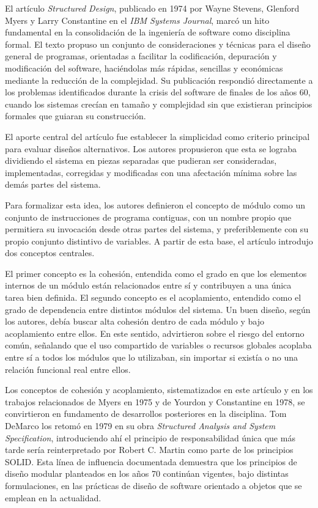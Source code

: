 \documentclass{./plantilla/umss}
\begin{document}
El artículo \textit{Structured Design}, publicado en 1974 por Wayne Stevens, Glenford Myers y Larry Constantine en el \textit{IBM Systems Journal}, marcó un hito fundamental en la consolidación de la ingeniería de software como disciplina formal. El texto propuso un conjunto de consideraciones y técnicas para el diseño general de programas, orientadas a facilitar la codificación, depuración y modificación del software, haciéndolas más rápidas, sencillas y económicas mediante la reducción de la complejidad. Su publicación respondió directamente a los problemas identificados durante la crisis del software de finales de los años 60, cuando los sistemas crecían en tamaño y complejidad sin que existieran principios formales que guiaran su construcción.

El aporte central del artículo fue establecer la simplicidad como criterio principal para evaluar diseños alternativos. Los autores propusieron que esta se lograba dividiendo el sistema en piezas separadas que pudieran ser consideradas, implementadas, corregidas y modificadas con una afectación mínima sobre las demás partes del sistema.

Para formalizar esta idea, los autores definieron el concepto de módulo como un conjunto de instrucciones de programa contiguas, con un nombre propio que permitiera su invocación desde otras partes del sistema, y preferiblemente con su propio conjunto distintivo de variables. A partir de esta base, el artículo introdujo dos conceptos centrales.

El primer concepto es la cohesión, entendida como el grado en que los elementos internos de un módulo están relacionados entre sí y contribuyen a una única tarea bien definida. El segundo concepto es el acoplamiento, entendido como el grado de dependencia entre distintos módulos del sistema. Un buen diseño, según los autores, debía buscar alta cohesión dentro de cada módulo y bajo acoplamiento entre ellos. En este sentido, advirtieron sobre el riesgo del entorno común, señalando que el uso compartido de variables o recursos globales acoplaba entre sí a todos los módulos que lo utilizaban, sin importar si existía o no una relación funcional real entre ellos.

Los conceptos de cohesión y acoplamiento, sistematizados en este artículo y en los trabajos relacionados de Myers en 1975 y de Yourdon y Constantine en 1978, se convirtieron en fundamento de desarrollos posteriores en la disciplina. Tom DeMarco los retomó en 1979 en su obra \textit{Structured Analysis and System Specification}, introduciendo ahí el principio de responsabilidad única que más tarde sería reinterpretado por Robert C. Martin como parte de los principios SOLID. Esta línea de influencia documentada demuestra que los principios de diseño modular planteados en los años 70 continúan vigentes, bajo distintas formulaciones, en las prácticas de diseño de software orientado a objetos que se emplean en la actualidad.
\end{document}
